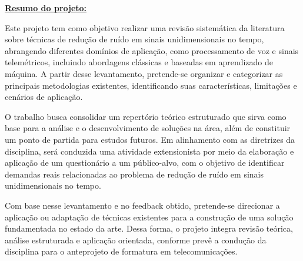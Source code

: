 \vfill

\noindent\textbf{\underline{Resumo do projeto:}}\par

\vfill

Este projeto tem como objetivo realizar uma revisão sistemática da literatura sobre técnicas de redução de ruído em sinais unidimensionais no tempo, abrangendo diferentes domínios de aplicação, como processamento de voz e sinais telemétricos, incluindo abordagens clássicas e baseadas em aprendizado de máquina. A partir desse levantamento, pretende-se organizar e categorizar as principais metodologias existentes, identificando suas características, limitações e cenários de aplicação.

\vfill

O trabalho busca consolidar um repertório teórico estruturado que sirva como base para a análise e o desenvolvimento de soluções na área, além de constituir um ponto de partida para estudos futuros. Em alinhamento com as diretrizes da disciplina, será conduzida uma atividade extensionista por meio da elaboração e aplicação de um questionário a um público-alvo, com o objetivo de identificar demandas reais relacionadas ao problema de redução de ruído em sinais unidimensionais no tempo.

\vfill

Com base nesse levantamento e no feedback obtido, pretende-se direcionar a aplicação ou adaptação de técnicas existentes para a construção de uma solução fundamentada no estado da arte. Dessa forma, o projeto integra revisão teórica, análise estruturada e aplicação orientada, conforme prevê a condução da disciplina para o anteprojeto de formatura em telecomunicações.

\vfill

%
%


